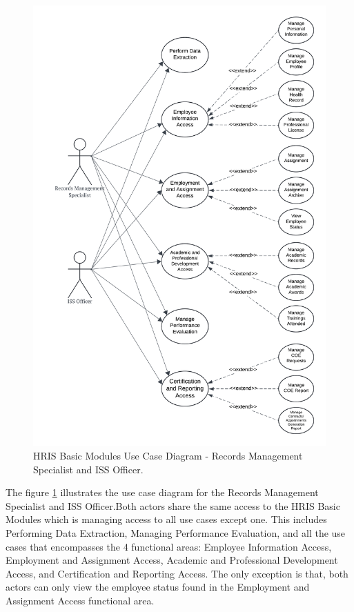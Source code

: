     \begin{figure}[H]
        \centering
        \includegraphics[width=0.9\linewidth]{figures/images/diagrams/usecase/use-case-basic-4.png}
        \caption{HRIS Basic Modules Use Case Diagram - Records Management Specialist and ISS Officer.}
        \label{fig:use-case-basic-4}
    \end{figure}

    The figure \ref{fig:use-case-basic-4} illustrates the use case diagram for the Records Management Specialist and ISS Officer.Both actors share the same access to the HRIS Basic Modules which is managing access to all use cases except one. This includes Performing Data Extraction, Managing Performance Evaluation, and all the use cases that encompasses the 4 functional areas: Employee Information Access, Employment and Assignment Access, Academic and Professional Development Access, and Certification and Reporting Access. The only exception is that, both actors can only view the employee status found in the Employment and Assignment Access functional area.

